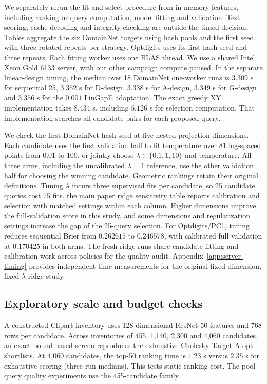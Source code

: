 \documentclass{article}
\begin{document}
We separately rerun the fit-and-select procedure from in-memory features, including ranking or query computation, model fitting and validation. Test scoring, cache decoding and integrity checking are outside the timed decision. Tables aggregate the six DomainNet targets using hash pools and the first seed, with three rotated repeats per strategy. Optdigits uses its first hash seed and three repeats. Each fitting worker uses one BLAS thread. We use a shared Intel Xeon Gold 6133 server, with our other campaign compute paused. In the separate linear-design timing, the median over 18 DomainNet one-worker runs is $3.309$ s for sequential 25, $3.352$ s for D-design, $3.338$ s for A-design, $3.349$ s for G-design and $3.356$ s for the $0.001$ LinGapE adaptation. The exact greedy XY implementation takes $8.434$ s, including $5.126$ s for selection computation. That implementation searches all candidate pairs for each proposed query.

We check the first DomainNet hash seed at five nested projection dimensions. Each candidate uses the first validation half to fit temperature over 81 log-spaced points from $0.01$ to $100$, or jointly choose $\lambda\in\{0.1,1,10\}$ and temperature. All three arms, including the uncalibrated $\lambda=1$ reference, use the other validation half for choosing the winning candidate. Geometric rankings retain their original definitions. Tuning $\lambda$ incurs three supervised fits per candidate, so 25 candidate queries cost 75 fits. the main paper ridge sensitivity table reports calibration and selection with matched settings within each column. Higher dimensions improve the full-validation score in this study, and some dimensions and regularization settings increase the gap of the 25-query selection. For Optdigits/PC1, tuning reduces sequential Brier from $0.262615$ to $0.246578$, with calibrated full validation at $0.170425$ in both arms. The fresh ridge runs share candidate fitting and calibration work across policies for the quality audit. Appendix~\ref{app:server-timing} provides independent time measurements for the original fixed-dimension, fixed-$\lambda$ ridge study.

\subsection{Exploratory scale and budget checks}
A constructed Clipart inventory uses 128-dimensional ResNet-50 features and 768 rows per candidate. Across inventories of 455, 1,140, 2,300 and 4,060 candidates, an exact bound-based screen reproduces the exhaustive Cholesky Target A-opt shortlists. At 4,060 candidates, the top-50 ranking time is $1.23$ s versus $2.35$ s for exhaustive scoring (three-run medians). This tests static ranking cost. The pool-query quality experiments use the 455-candidate family.
\end{document}
